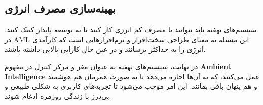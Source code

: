 \subsection*{بهینه‌سازی مصرف انرژی}
سیستم‌های نهفته باید بتوانند با مصرف کم انرژی کار کنند تا به توسعه پایدار کمک کنند. در AMI، این مسئله به معنای طراحی سخت‌افزار و نرم‌افزارهایی است که کارآمدی انرژی را به حداکثر برسانند و در عین حال کارایی بالایی داشته باشند.

در نهایت، سیستم‌های نهفته به عنوان مغز و مرکز کنترل در مفهوم \textbf{Ambient Intelligence} عمل می‌کنند، که به آن‌ها اجازه می‌دهد تا به صورت همزمان هم هوشمند و هم پنهان باقی بمانند. این امر موجب می‌شود تا تجربه‌های کاربری به شکلی طبیعی و بی‌درز با زندگی روزمره ادغام شوند.

